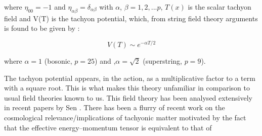 \documentclass[a4paper,prd,aps,twocolumn]{revtex4}
\begin{document}
\noindent where $\eta_{00} = -1 $ and $\eta_{\alpha\beta} = \delta_{\alpha\beta}$
with $\alpha$, $\beta = 1,2,...p$,
$T(x)$ is the scalar tachyon field and  V(T) is the tachyon potential,
which, from string field theory arguments is found to be given by : 

\begin{equation}
V(T) \sim e^{-\alpha T/2} 
\end{equation}

\noindent where $ \alpha=1$ (bosonic, $p=25$) and ,$\alpha =  \sqrt{2}$
(superstring, $p=9$).

The tachyon potential appears, in the action, as a multiplicative factor to 
a term with a square root. This
is what makes this theory unfamiliar in comparison to usual field theories
known to us.
This field theory has been analysed extensively in recent papers by
Sen {\cite{sen2}}. There has been a flurry of recent work on the cosmological
relevance/implications of tachyonic matter {\cite{gibbons}} motivated by the 
fact that
the effective energy--momentum tensor is equivalent to that of
\end{document}
